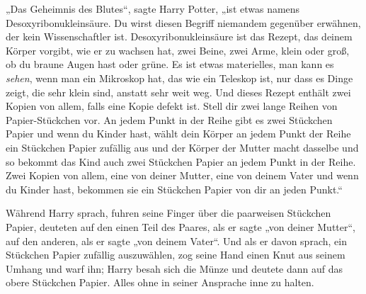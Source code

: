 „Das Geheimnis des Blutes“, sagte Harry Potter, „ist etwas namens Desoxyribonukleinsäure. Du wirst diesen Begriff niemandem gegenüber erwähnen, der kein Wissenschaftler ist. Desoxyribonukleinsäure ist das Rezept, das deinem Körper vorgibt, wie er zu wachsen hat, zwei Beine, zwei Arme, klein oder groß, ob du braune Augen hast oder grüne. Es ist etwas materielles, man kann es \emph{sehen}, wenn man ein Mikroskop hat, das wie ein Teleskop ist, nur dass es Dinge zeigt, die sehr klein sind, anstatt sehr weit weg. Und dieses Rezept enthält zwei Kopien von allem, falls eine Kopie defekt ist. Stell dir zwei lange Reihen von Papier-Stückchen vor. An jedem Punkt in der Reihe gibt es zwei Stückchen Papier und wenn du Kinder hast, wählt dein Körper an jedem Punkt der Reihe ein Stückchen Papier zufällig aus und der Körper der Mutter macht dasselbe und so bekommt das Kind auch zwei Stückchen Papier an jedem Punkt in der Reihe. Zwei Kopien von allem, eine von deiner Mutter, eine von deinem Vater und wenn du Kinder hast, bekommen sie ein Stückchen Papier von dir an jeden Punkt.“

Während Harry sprach, fuhren seine Finger über die paarweisen Stückchen Papier, deuteten auf den einen Teil des Paares, als er sagte „von deiner Mutter“, auf den anderen, als er sagte „von deinem Vater“. Und als er davon sprach, ein Stückchen Papier zufällig auszuwählen, zog seine Hand einen Knut aus seinem Umhang und warf ihn; Harry besah sich die Münze und deutete dann auf das obere Stückchen Papier. Alles ohne in seiner Ansprache inne zu halten.


